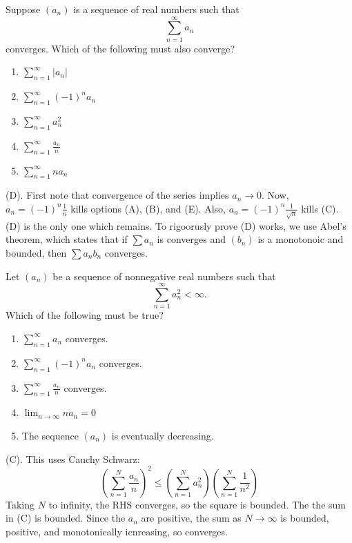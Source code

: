 \begin{exercise}
Suppose $(a_n)$ is a sequence of real numbers such that
\[
\sum_{n=1}^{\infty}a_n
\]
converges. Which of the following must also converge?
\begin{enumerate}[label=(\Alph*)]
    \item $\displaystyle\sum_{n=1}^{\infty}|a_n|$
    \item $\displaystyle\sum_{n=1}^{\infty}(-1)^n a_n$
    \item $\displaystyle\sum_{n=1}^{\infty}a_n^2$
    \item $\displaystyle\sum_{n=1}^{\infty}\frac{a_n}{n}$
    \item $\displaystyle\sum_{n=1}^{\infty}na_n$
\end{enumerate}
\end{exercise}
\begin{solution}
(D). First note that convergence of the series implies $a_n \rightarrow 0$. 
Now, $a_n = (-1)^n \frac{1}{n}$ kills options (A), (B), and (E). Also, $a_n = (-1)^n \frac{1}{\sqrt{n}}$
kills (C). (D) is the only one which remains. To rigoorusly prove (D) works, 
we use Abel's theorem, which states that if $\sum a_n$ is converges and $(b_n)$ is a 
monotonoic and bounded, then $\sum a_nb_n$ converges.
\end{solution}

\begin{exercise}
Let $(a_n)$ be a sequence of nonnegative real numbers such that
\[
\sum_{n=1}^{\infty}a_n^2<\infty.
\]
Which of the following must be true?
\begin{enumerate}[label=(\Alph*)]
    \item $\displaystyle\sum_{n=1}^{\infty}a_n$ converges.
    \item $\displaystyle\sum_{n=1}^{\infty}(-1)^n a_n$ converges.
    \item $\displaystyle\sum_{n=1}^{\infty}\frac{a_n}{n}$ converges.
    \item $\displaystyle\lim_{n\to\infty}na_n=0$
    \item The sequence $(a_n)$ is eventually decreasing.
\end{enumerate}
\end{exercise}
\begin{solution}
(C). This uses Cauchy Schwarz:
\[
\left(\sum_{n = 1}^N \frac{a_n}{n} \right)^2
\leq \left(\sum_{n = 1}^N a_n^2\right) \left(\sum_{n = 1}^N \frac{1}{n^2}\right)
\]
Taking $N$ to infinity, the RHS converges, so the square is bounded. The the sum 
in (C) is bounded. Since the $a_n$ are positive, the sum as $N \rightarrow \infty$
is bounded, positive, and monotonically icnreasing, so converges.
\end{solution}

